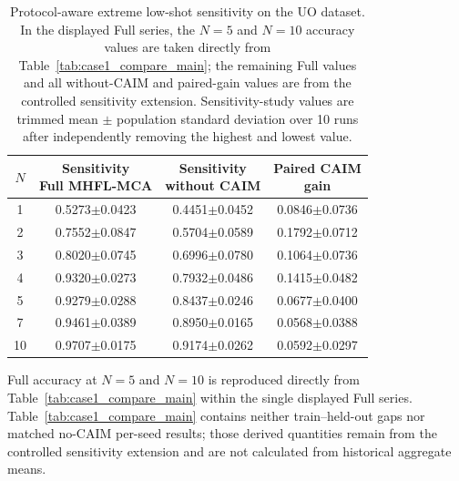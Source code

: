\begin{table}[pos=htbp]
\centering
\caption{Protocol-aware extreme low-shot sensitivity on the UO dataset. In the displayed Full series, the $N=5$ and $N=10$ accuracy values are taken directly from Table~\ref{tab:case1_compare_main}; the remaining Full values and all without-CAIM and paired-gain values are from the controlled sensitivity extension. Sensitivity-study values are trimmed mean $\pm$ population standard deviation over 10 runs after independently removing the highest and lowest value.}
\label{tab:extreme_lowshot_caim}
\small
\setlength{\tabcolsep}{2.8pt}
\renewcommand{\arraystretch}{1.10}
\begin{tabular*}{\linewidth}{@{\extracolsep{\fill}}cccc@{}}
\toprule
$N$ & \shortstack{Sensitivity\\Full MHFL-MCA} & \shortstack{Sensitivity\\without CAIM} & \shortstack{Paired CAIM\\gain} \\
\midrule
1 & 0.5273$\pm$0.0423 & 0.4451$\pm$0.0452 & 0.0846$\pm$0.0736 \\
2 & 0.7552$\pm$0.0847 & 0.5704$\pm$0.0589 & 0.1792$\pm$0.0712 \\
3 & 0.8020$\pm$0.0745 & 0.6996$\pm$0.0780 & 0.1064$\pm$0.0736 \\
4 & 0.9320$\pm$0.0273 & 0.7932$\pm$0.0486 & 0.1415$\pm$0.0482 \\
5 & 0.9279$\pm$0.0288 & 0.8437$\pm$0.0246 & 0.0677$\pm$0.0400 \\
7 & 0.9461$\pm$0.0389 & 0.8950$\pm$0.0165 & 0.0568$\pm$0.0388 \\
10 & 0.9707$\pm$0.0175 & 0.9174$\pm$0.0262 & 0.0592$\pm$0.0297 \\
\bottomrule
\end{tabular*}
\vspace{1mm}
\raggedright\footnotesize Full accuracy at $N=5$ and $N=10$ is reproduced directly from Table~\ref{tab:case1_compare_main} within the single displayed Full series. Table~\ref{tab:case1_compare_main} contains neither train--held-out gaps nor matched no-CAIM per-seed results; those derived quantities remain from the controlled sensitivity extension and are not calculated from historical aggregate means.\par
\end{table}
